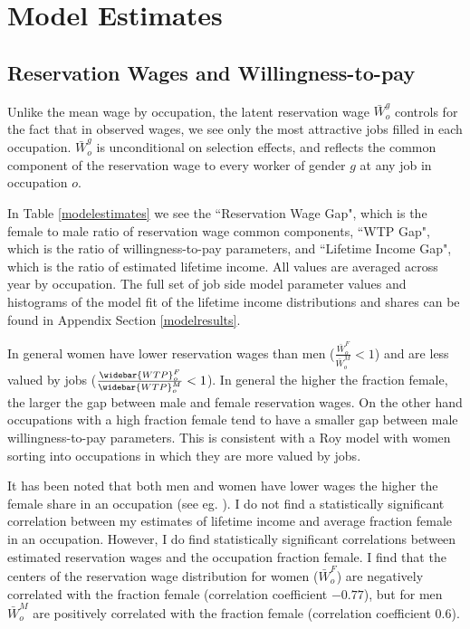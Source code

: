 \documentclass[12pt]{article}
\begin{document}




\section{Model Estimates} \label{results}
\subsection{Reservation Wages and Willingness-to-pay}
Unlike the mean wage by occupation, the latent reservation wage $\bar{W}^g_o $ controls for the fact that in observed wages, we see only the most attractive jobs filled in each occupation.  $\bar{W}^g_o $ is unconditional on selection effects, and reflects the common component of the reservation wage to every worker of gender $g$ at any job in occupation $o$. 

In Table \ref{modelestimates} we see the ``Reservation Wage Gap", which is the female to male ratio of reservation wage common components, ``WTP Gap", which is the ratio of willingness-to-pay parameters, and ``Lifetime Income Gap", which is the ratio of estimated lifetime income. All values are averaged across year by occupation. The full set of job side model parameter values and histograms of the model fit of the lifetime income distributions and shares can be found in Appendix Section \ref{modelresults}.

In general women have lower reservation wages than men ($  \frac{\bar{W}^F_o}{\bar{W}^M_o} < 1$) and are less valued by jobs ($ \frac{\widebar{WTP}^F_o}{\widebar{WTP}^M_o} < 1$). In general the higher the fraction female, the larger the gap between male and female reservation wages. On the other hand occupations with a high fraction female tend to have a smaller gap between male willingness-to-pay parameters. This is consistent with a Roy model with women sorting into occupations in which they are more valued by jobs.




It has been noted that both men and women have lower wages the higher the female share in an occupation (see eg. ). I do not find a statistically significant correlation between my estimates of lifetime income and average fraction female in an occupation. However, I do find statistically significant correlations between estimated reservation wages and the occupation fraction female. I find that the centers of the reservation wage distribution for women ($\bar{W}^F_o $) are negatively correlated with the fraction female (correlation coefficient $-0.77$), but for men $\bar{W}^M_o $ are positively correlated with the fraction female (correlation coefficient $0.6$). 
\end{document}
